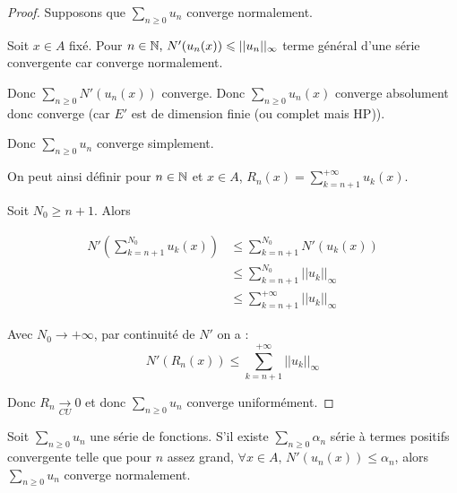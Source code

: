 
\begin{proof}
    Supposons que $\displaystyle \sum_{n \geqslant 0} u_n$ converge normalement.

    Soit $x \in A$ fixé. Pour $n \in \mathbb{N}, \, N'(u_n(x)) \leqslant || u_n ||_{\infty}$ terme général 
    d'une série convergente car converge normalement. 

    Donc $\sum_{n \geqslant 0} N'(u_n(x))$ converge. Donc $\sum_{n \geqslant 0} u_n(x)$
    converge absolument donc converge (car $E'$ est de dimension finie (ou complet mais HP)). 

    Donc $\displaystyle \sum_{n \geqslant 0} u_n$ converge simplement.

    On peut ainsi définir pour $n \in \mathbb{N}$ et $x \in A$, $\displaystyle R_n(x) = \sum_{k = n + 1}^{ + \infty } u_k(x)$.


    Soit $N_0 \geqslant n + 1$. Alors 

    \begin{align}
        N'\left( \sum_{k = n + 1}^{N_0} u_k(x) \right) & \leqslant \sum_{k = n + 1}^{N_0} N'(u_k(x)) \\
        & \leqslant \sum_{k = n + 1}^{N_0} || u_k ||_{\infty} \\
        & \leqslant \sum_{k = n + 1}^{ + \infty } || u_k ||_{\infty}
    \end{align}

    Avec $N_0 \to + \infty$, par continuité de $N'$ on a : 
    \[
        N'(R_n(x)) \leqslant \sum_{k = n + 1}^{ + \infty } || u_k ||_{\infty}
    \]

    Donc $\displaystyle R_n \xrightarrow[CU]{} 0$ et donc $\displaystyle \sum_{n \geqslant 0} u_n$ converge uniformément.
\end{proof}

\begin{proposition}{}{}
    Soit $\sum_{n \geqslant 0} u_n$ une série de fonctions. S'il existe
    $\sum_{n \geqslant 0} \alpha_n$ série à termes positifs convergente telle que 
    pour $n$ assez grand, $\forall x \in A, \, N'(u_n(x)) \leqslant \alpha_n$, alors 
    $\sum_{n \geqslant 0} u_n$ converge normalement.
\end{proposition}



